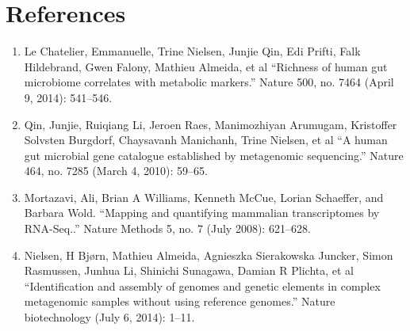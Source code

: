 \documentclass[]{article}
\begin{document}
\section{References}\label{references}

\begin{enumerate}
\def\labelenumi{\arabic{enumi}.}
\itemsep1pt\parskip0pt
\item
  Le Chatelier, Emmanuelle, Trine Nielsen, Junjie Qin, Edi Prifti, Falk
  Hildebrand, Gwen Falony, Mathieu Almeida, et al ``Richness of human
  gut microbiome correlates with metabolic markers.'' Nature 500, no.
  7464 (April 9, 2014): 541--546.\\
\item
  Qin, Junjie, Ruiqiang Li, Jeroen Raes, Manimozhiyan Arumugam,
  Kristoffer Solvsten Burgdorf, Chaysavanh Manichanh, Trine Nielsen, et
  al ``A human gut microbial gene catalogue established by metagenomic
  sequencing.'' Nature 464, no. 7285 (March 4, 2010): 59--65.\\
\item
  Mortazavi, Ali, Brian A Williams, Kenneth McCue, Lorian Schaeffer, and
  Barbara Wold. ``Mapping and quantifying mammalian transcriptomes by
  RNA-Seq..'' Nature Methods 5, no. 7 (July 2008): 621--628.\\
\item
  Nielsen, H Bjørn, Mathieu Almeida, Agnieszka Sierakowska Juncker,
  Simon Rasmussen, Junhua Li, Shinichi Sunagawa, Damian R Plichta, et al
  ``Identification and assembly of genomes and genetic elements in
  complex metagenomic samples without using reference genomes.'' Nature
  biotechnology (July 6, 2014): 1--11.
\end{enumerate}
\end{document}
